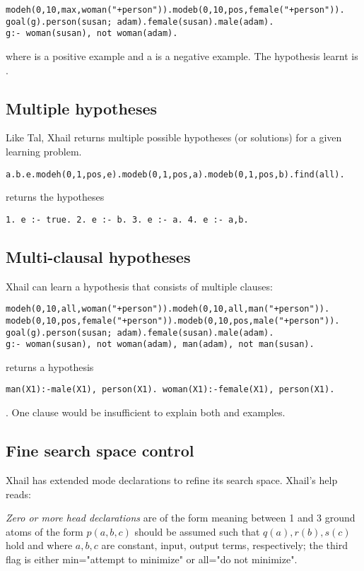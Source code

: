 \begin{lstlisting}
modeh(0,10,max,woman("+person")).modeb(0,10,pos,female("+person")).
goal(g).person(susan; adam).female(susan).male(adam).
g:- woman(susan), not woman(adam).
\end{lstlisting}
where  is a positive example and a  is a negative example. The hypothesis learnt is
.

\subsection{Multiple hypotheses}
Like Tal, Xhail returns multiple possible hypotheses (or solutions) for a given learning problem.
\begin{lstlisting}
a.b.e.modeh(0,1,pos,e).modeb(0,1,pos,a).modeb(0,1,pos,b).find(all).
\end{lstlisting}
returns the hypotheses
\begin{lstlisting}
1. e :- true. 2. e :- b. 3. e :- a. 4. e :- a,b.
\end{lstlisting}

\subsection{Multi-clausal hypotheses}
Xhail can learn a hypothesis that consists of multiple clauses:
\begin{lstlisting}
modeh(0,10,all,woman("+person")).modeh(0,10,all,man("+person")).
modeb(0,10,pos,female("+person")).modeb(0,10,pos,male("+person")).
goal(g).person(susan; adam).female(susan).male(adam).
g:- woman(susan), not woman(adam), man(adam), not man(susan).
\end{lstlisting}
returns a hypothesis
\begin{lstlisting}
man(X1):-male(X1), person(X1). woman(X1):-female(X1), person(X1).
\end{lstlisting}.
One clause would be insufficient to explain both  and  examples.

\subsection{Fine search space control}
Xhail has extended mode declarations to refine its search space. Xhail's help reads:

\emph{Zero or more head declarations} are of the form
 meaning between 1 and 3 ground atoms
 of the form $p(a,b,c)$ should be assumed such that $q(a), r(b), s(c)$ hold 
 and where $a, b, c$ are constant, input, output terms, respectively;
 the third flag is either min="attempt to minimize" or all="do not minimize".
 
